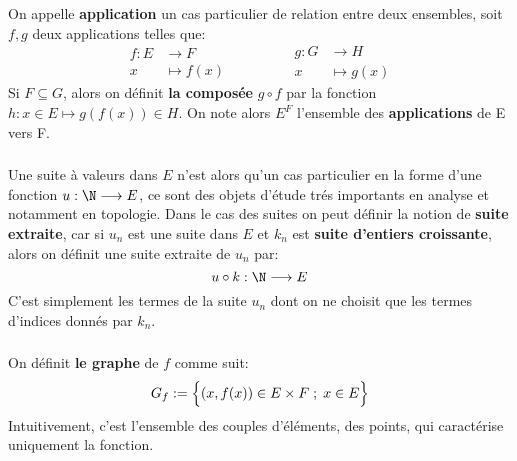 \chapter*{}

On appelle \textbf{application} un cas particulier de relation entre deux ensembles, soit \(f, g\) deux applications telles que:
\[
   \begin{aligned}
      f: E &\longrightarrow F\\
      x &\longmapsto f(x)
   \end{aligned}
      \hspace{50pt}
   \begin{aligned}
      g: G&\longrightarrow H\\
      x&\longmapsto g(x)
   \end{aligned}
\]
Si \(F \subseteq G\), alors on définit \textbf{la composée} \(g \circ f\) par la fonction \(h: x \in E \longmapsto g(f(x)) \in H\). On note alors \(E^F\) l'ensemble des \textbf{applications} de E vers F.



\subsection*{}
Une suite à valeurs dans \(E\) n'est alors qu'un cas particulier en la forme d'une fonction \(u : \N \longrightarrow E\), ce sont des objets d'étude trés importants en analyse et notamment en topologie. Dans le cas des suites on peut définir la notion de \textbf{suite extraite}, car si \(u_n\) est une suite dans \(E\) et \(k_n\) est \textbf{suite d'entiers croissante}, alors on définit une suite extraite de \(u_n\) par:
\[
   u \circ k : \N \longrightarrow E
\]
C'est simplement les termes de la suite \(u_n\) dont on ne choisit que les termes d'indices donnés par \(k_n\).
\subsection*{}
On définit \textbf{le graphe} de \(f\) comme suit:
\[
   G_f:= \Bigl\{ (x, f(x)) \in E \times F \; ; \; x \in E\Bigl\}   
\]
Intuitivement, c'est l'ensemble des couples d'éléments, des points, qui caractérise uniquement la fonction.
\subsection*{}

